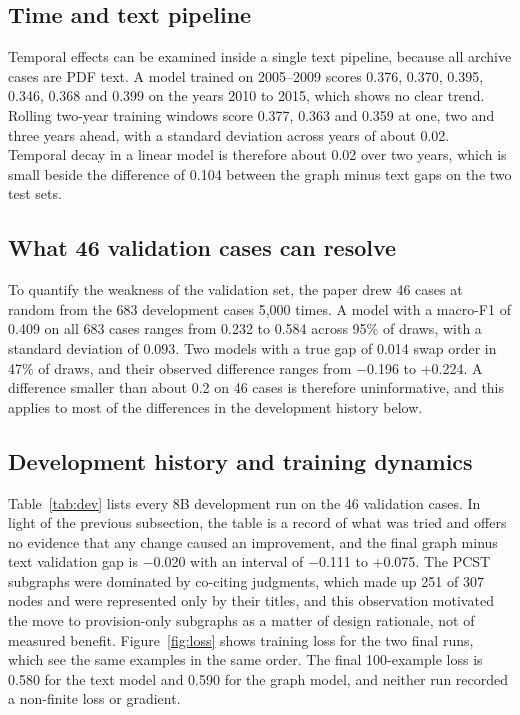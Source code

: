 \documentclass[journal]{IEEEtran}
\begin{document}
\subsection{Time and text pipeline}\label{sec:res-time}
Temporal effects can be examined inside a single text pipeline, because all archive cases are PDF text. A model trained on 2005--2009 scores 0.376, 0.370, 0.395, 0.346, 0.368 and 0.399 on the years 2010 to 2015, which shows no clear trend. Rolling two-year training windows score 0.377, 0.363 and 0.359 at one, two and three years ahead, with a standard deviation across years of about 0.02. Temporal decay in a linear model is therefore about 0.02 over two years, which is small beside the difference of 0.104 between the graph minus text gaps on the two test sets.

\subsection{What 46 validation cases can resolve}\label{sec:res-valsize}
To quantify the weakness of the validation set, the paper drew 46 cases at random from the 683 development cases 5,000 times. A model with a macro-F1 of 0.409 on all 683 cases ranges from 0.232 to 0.584 across 95\% of draws, with a standard deviation of 0.093. Two models with a true gap of 0.014 swap order in 47\% of draws, and their observed difference ranges from $-$0.196 to +0.224. A difference smaller than about 0.2 on 46 cases is therefore uninformative, and this applies to most of the differences in the development history below.

\subsection{Development history and training dynamics}
Table~\ref{tab:dev} lists every 8B development run on the 46 validation cases. In light of the previous subsection, the table is a record of what was tried and offers no evidence that any change caused an improvement, and the final graph minus text validation gap is $-$0.020 with an interval of $-$0.111 to +0.075. The PCST subgraphs were dominated by co-citing judgments, which made up 251 of 307 nodes and were represented only by their titles, and this observation motivated the move to provision-only subgraphs as a matter of design rationale, not of measured benefit. Figure~\ref{fig:loss} shows training loss for the two final runs, which see the same examples in the same order. The final 100-example loss is 0.580 for the text model and 0.590 for the graph model, and neither run recorded a non-finite loss or gradient.
\end{document}
